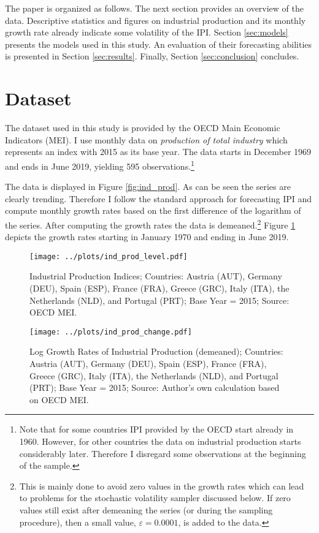 \documentclass[12pt,letterpaper,fleqn]{article}           %
\begin{document}
The paper is organized as follows. The next section provides an overview of the data. Descriptive statistics and figures on industrial production and its monthly growth rate already indicate some volatility of the IPI. Section \ref{sec:models} presents the models used in this study. An evaluation of their forecasting abilities is presented in Section \ref{sec:results}. Finally, Section \ref{sec:conclusion} concludes.

\section{Dataset}
\label{sec:data}

The dataset used in this study is provided by the OECD Main Economic Indicators (MEI). I use monthly data on \textit{production of total industry} which represents an index with 2015 as its base year. The data starts in December 1969 and ends in June 2019, yielding 595 observations.\footnote{Note that for some countries IPI provided by the OECD start already in 1960. However, for other countries the data on industrial production starts considerably later. Therefore I disregard some observations at the beginning of the sample.} 

The data is displayed in Figure \ref{fig:ind_prod}. As can be seen the series are clearly trending. Therefore I follow the standard approach for forecasting IPI and compute monthly growth rates based on the first difference of the logarithm of the series. After computing the growth rates the data is demeaned.\footnote{This is mainly done to avoid zero values in the growth rates which can lead to problems for the stochastic volatility sampler discussed below. If zero values still exist after demeaning the series (or during the sampling procedure), then a small value, $\varepsilon = 0.0001$, is added to the data.} Figure \ref{fig:ind_prod_growth} depicts the growth rates starting in January 1970 and ending in June 2019. 

\begin{figure}
\captionsetup{singlelinecheck=false, justification=justified}
\centering \texttt{[image: ../plots/ind\_prod\_level.pdf]} 
\caption{Industrial Production Indices; Countries: Austria (AUT), Germany (DEU), Spain (ESP), France (FRA), Greece (GRC), Italy (ITA), the Netherlands (NLD), and Portugal (PRT); Base Year = 2015; Source: OECD MEI.}
\label{fig:ind_prod} 

\centering \texttt{[image: ../plots/ind\_prod\_change.pdf]} 
\caption{Log Growth Rates of Industrial Production (demeaned); Countries: Austria (AUT), Germany (DEU), Spain (ESP), France (FRA), Greece (GRC), Italy (ITA), the Netherlands (NLD), and Portugal (PRT); Base Year = 2015; Source: Author's own calculation based on OECD MEI.}
\label{fig:ind_prod_growth} 
\end{figure}
\end{document}
